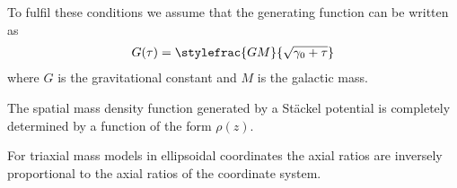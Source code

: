    To fulfil these conditions we assume that the generating function can be written as
    \begin{gather}
        G(\tau) = \stylefrac{GM}{\sqrt{\gamma_0 + \tau}}
    \end{gather}
    where $G$ is the gravitational constant and $M$ is the galactic mass.

    \begin{theorem}
        The spatial mass density function generated by a St\"ackel potential is completely determined by a function of the form $\rho(z)$.
    \end{theorem}
    \begin{result}
        For triaxial mass models in ellipsoidal coordinates the axial ratios are inversely proportional to the axial ratios of the coordinate system.
    \end{result}